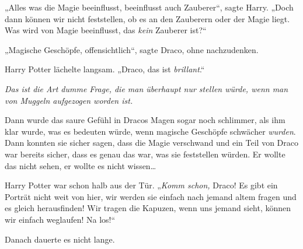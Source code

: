 „Alles was die Magie beeinflusst, beeinflusst auch Zauberer“, sagte Harry. „Doch dann können wir nicht feststellen, ob es an den Zauberern oder der Magie liegt. Was wird von Magie beeinflusst, das \emph{kein} Zauberer ist?“

„Magische Geschöpfe, offensichtlich“, sagte Draco, ohne nachzudenken.

Harry Potter lächelte langsam. „Draco, das ist \emph{brillant}.“

\emph{Das ist die Art dumme Frage, die man überhaupt nur stellen würde, wenn man von Muggeln aufgezogen worden ist.}

Dann wurde das saure Gefühl in Dracos Magen sogar noch schlimmer, als ihm klar wurde, was es bedeuten würde, wenn magische Geschöpfe schwächer \emph{wurden}. Dann konnten sie sicher sagen, dass die Magie verschwand und ein Teil von Draco war bereits sicher, dass es genau das war, was sie feststellen würden. Er wollte das nicht sehen, er wollte es nicht wissen…

Harry Potter war schon halb aus der Tür. „\emph{Komm schon,} Draco! Es gibt ein Porträt nicht weit von hier, wir werden sie einfach nach jemand altem fragen und es gleich herausfinden! Wir tragen die Kapuzen, wenn uns jemand sieht, können wir einfach weglaufen! Na los!“

\later

Danach dauerte es nicht lange.

